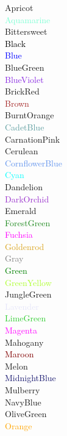 \documentclass[12pt]{article}
\begin{document}
\textcolor{Apricot}{Apricot}\\
\textcolor{Aquamarine}{Aquamarine}\\
\textcolor{Bittersweet}{Bittersweet}\\
\textcolor{Black}{Black}\\
\textcolor{Blue}{Blue}\\
\textcolor{BlueGreen}{BlueGreen}\\
\textcolor{BlueViolet}{BlueViolet}\\
\textcolor{BrickRed}{BrickRed}\\
\textcolor{Brown}{Brown}\\
\textcolor{BurntOrange}{BurntOrange}\\
\textcolor{CadetBlue}{CadetBlue}\\
\textcolor{CarnationPink}{CarnationPink}\\
\textcolor{Cerulean}{Cerulean}\\
\textcolor{CornflowerBlue}{CornflowerBlue}\\
\textcolor{Cyan}{Cyan}\\
\textcolor{Dandelion}{Dandelion}\\
\textcolor{DarkOrchid}{DarkOrchid}\\
\textcolor{Emerald}{Emerald}\\
\textcolor{ForestGreen}{ForestGreen}\\
\textcolor{Fuchsia}{Fuchsia}\\
\textcolor{Goldenrod}{Goldenrod}\\
\textcolor{Gray}{Gray}\\
\textcolor{Green}{Green}\\
\textcolor{GreenYellow}{GreenYellow}\\
\textcolor{JungleGreen}{JungleGreen}\\
\textcolor{Lavender}{Lavender}\\
\textcolor{LimeGreen}{LimeGreen}\\
\textcolor{Magenta}{Magenta}\\
\textcolor{Mahogany}{Mahogany}\\
\textcolor{Maroon}{Maroon}\\
\textcolor{Melon}{Melon}\\
\textcolor{MidnightBlue}{MidnightBlue}\\
\textcolor{Mulberry}{Mulberry}\\
\textcolor{NavyBlue}{NavyBlue}\\
\textcolor{OliveGreen}{OliveGreen}\\
\textcolor{Orange}{Orange}\\
\end{document}

